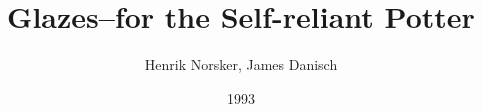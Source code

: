 \documentclass[10pt,a4paper]{book}
\begin{document}
\begin{titlepage}
\title{Glazes--for the Self-reliant Potter}
\date{1993}
\author{Henrik Norsker, James Danisch}
\maketitle
\end{titlepage}
\tableofcontents

















\begin{appendix}
%
%
%
%
%
%
%







%
%
\end{appendix}
\end{document}
